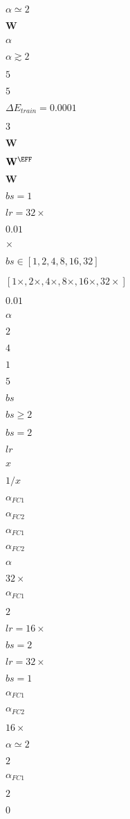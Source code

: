 $\alpha\simeq 2$

$\mathbf{W}$

$\alpha$

$\alpha \gtrsim 2$

$5$

$5$

$\Delta E_{train}=0.0001$

$3$

$\mathbf{W}$

$\mathbf{W}^{\EFF}$

$\mathbf{W}$


$bs=1$

$lr=32\times$

$0.01$

$\times$

$bs\in[1,2,4,8,16,32]$

$[1\times,2\times,4\times,8\times,16\times,32\times]$

$0.01$

$\alpha$

$2$

$4$

$1$

$5$

$bs$

$bs \ge 2$

$bs=2$

$lr$

$x$

$1/x$

$\alpha_{FC1}$

$\alpha_{FC2}$

$\alpha_{FC1}$

$\alpha_{FC2}$

$\alpha$

$32\times$

$\alpha_{FC1}$

$2$

$lr=16\times$

$bs=2$

$lr=32\times$

$bs=1$

$\alpha_{FC1}$

$\alpha_{FC2}$

$16\times$

$\alpha\simeq 2$

$2$

$\alpha_{FC1}$

$2$

$0$

